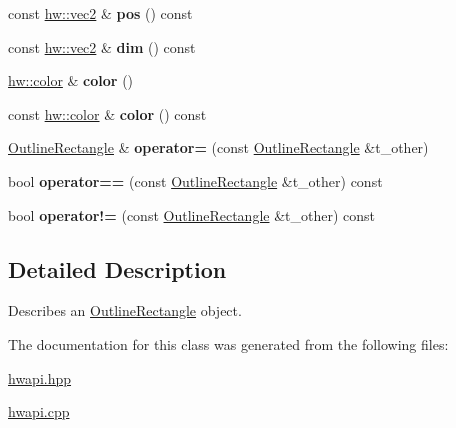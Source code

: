 \begin{DoxyCompactItemize}
const \mbox{\hyperlink{structhw_1_1vec2}{hw\+::vec2}} \& {\bfseries pos} () const
\item 
\mbox{\label{classdummy__api_1_1OutlineRectangle_ac243b397a67c33eb0ef51636f478dd6b}} 
const \mbox{\hyperlink{structhw_1_1vec2}{hw\+::vec2}} \& {\bfseries dim} () const
\item 
\mbox{\label{classdummy__api_1_1OutlineRectangle_ac2bc2fe2a945d0f44542a4292d22121b}} 
\mbox{\hyperlink{structhw_1_1color}{hw\+::color}} \& {\bfseries color} ()
\item 
\mbox{\label{classdummy__api_1_1OutlineRectangle_a01eb26be86dd447712840373bfef2ee1}} 
const \mbox{\hyperlink{structhw_1_1color}{hw\+::color}} \& {\bfseries color} () const
\item 
\mbox{\label{classdummy__api_1_1OutlineRectangle_a9b738d776c0c85cdc28619ad44ef6adc}} 
\mbox{\hyperlink{classdummy__api_1_1OutlineRectangle}{Outline\+Rectangle}} \& {\bfseries operator=} (const \mbox{\hyperlink{classdummy__api_1_1OutlineRectangle}{Outline\+Rectangle}} \&t\+\_\+other)
\item 
\mbox{\label{classdummy__api_1_1OutlineRectangle_a27cfec77c438b1d6b4674e99a5c6687f}} 
bool {\bfseries operator==} (const \mbox{\hyperlink{classdummy__api_1_1OutlineRectangle}{Outline\+Rectangle}} \&t\+\_\+other) const
\item 
\mbox{\label{classdummy__api_1_1OutlineRectangle_a47d7fe9d8732c76650fce674273ab0af}} 
bool {\bfseries operator!=} (const \mbox{\hyperlink{classdummy__api_1_1OutlineRectangle}{Outline\+Rectangle}} \&t\+\_\+other) const
\end{DoxyCompactItemize}


\subsection{Detailed Description}
Describes an \mbox{\hyperlink{classdummy__api_1_1OutlineRectangle}{Outline\+Rectangle}} object. 

The documentation for this class was generated from the following files\+:\begin{DoxyCompactItemize}
\item 
\mbox{\hyperlink{hwapi_8hpp}{hwapi.\+hpp}}\item 
\mbox{\hyperlink{hwapi_8cpp}{hwapi.\+cpp}}\end{DoxyCompactItemize}
